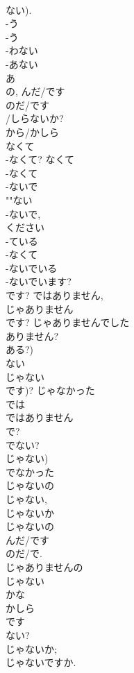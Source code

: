 \documentclass[8pt]{extreport}
\begin{document}
\begin{CJK}{UTF8}{min}
\\	ない).	
\\	-う 
\\	-う 
\\	-わない 
\\	-あない 
\\	あ 
\\	の, んだ/です 
\\	のだ/です	
\\	/しらないか?
\\	から/かしら 
\\	なくて 
\\	-なくて?	なくて
\\	-なくて 
\\	-ないで 
\\	""ない
\\	-ないで, 
\\	ください 
\\	-ている 
\\	-なくて 
\\	-ないでいる 
\\	-ないでいます?	
\\	です?	ではありません, 
\\	じゃありません	
\\	です?	じゃありませんでした	
\\	ありません?
\\	ある?)
\\	ない			
\\	じゃない 
\\	です)?	じゃなかった			
\\	では 
\\	ではありません 
\\	で?			
\\	でない?
\\	じゃない)
\\	でなかった 
\\	じゃないの 
\\	じゃない, 
\\	じゃないか 
\\	じゃないの 
\\	んだ/です 
\\	のだ/で.
\\	じゃありませんの 
\\	じゃない 
\\	かな 
\\	かしら 
\\	です 
\\	ない?	
\\	じゃないか;
\\	じゃないですか.

\end{CJK}
\end{document}
